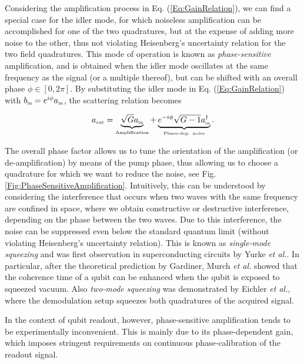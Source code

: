 \documentclass[aip,apr,twocolumn,showpacs,superscriptaddress,groupedaddress,nofootinbib,reprint]{revtex4-1}  %
\begin{document}
Considering the amplification process in Eq. (\ref{Eq:GainRelation}), we can find a special case for the idler mode, for which noiseless amplification can be accomplished for one of the two quadratures, but at the expense of adding more noise to the other, thus not violating Heisenberg's uncertainty relation for the two field quadratures. This mode of operation is known as \textit{phase-sensitive} amplification, and is obtained when the idler mode oscillates at the same frequency as the signal (or a multiple thereof), but can be shifted with an overall phase $\phi \in [0,2\pi]$. By substituting the idler mode in Eq. (\ref{Eq:GainRelation}) with $b_{\mbox{\tiny{in}}} = e^{i\phi}a_{\mbox{\tiny{in}}}$, the scattering relation becomes

\begin{equation}
a_{\mbox{\tiny{out}}} = \underbrace{\sqrt{G}a_{\mbox{\tiny{in}}}}_{\mbox{\tiny{Amplification}}} + \underbrace{e^{-i\phi}\sqrt{G - 1}a_{\mbox{\tiny{in}}}^{\dagger}}_{\mbox{\tiny{Phase-dep. noise}}}.
\label{Eq:GainRelation2}
\end{equation}

The overall phase factor allows us to tune the orientation of the amplification (or de-amplification) by means of the pump phase, thus allowing us to choose a quadrature for which we want to reduce the noise, see Fig. \ref{Fig:PhaseSensitiveAmplification}. Intuitively, this can be understood by considering the interference that occurs when two waves with the same frequency are confined in space, where we obtain constructive or destructive interference, depending on the phase between the two waves. Due to this interference, the noise can be suppressed even below the standard quantum limit (without violating Heisenberg's uncertainty relation). This is known as \textit{single-mode squeezing} and was first observation in superconducting circuits by Yurke \textit{et al.}\cite{Yurke1988}. In particular, after the theoretical prediction by Gardiner\cite{Gardiner1986}, Murch \textit{et al.} showed that the coherence time of a qubit can be enhanced when the qubit is exposed to squeezed vacuum\cite{Murch2013,Toyli2016}. Also \textit{two-mode squeezing} was demonstrated by Eichler \textit{et al.}\cite{Eichler2011}, where the demodulation setup squeezes both quadratures of the acquired signal\cite{Didier2015}.

In the context of qubit readout, however, phase-sensitive amplification tends to be experimentally inconvenient. This is mainly due to its phase-dependent gain, which imposes stringent requirements on continuous phase-calibration of the readout signal.
\end{document}

